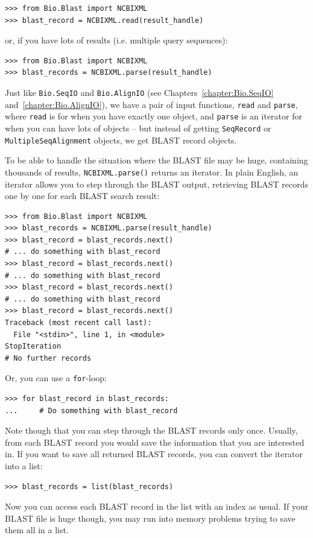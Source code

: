 \documentclass{report}
\begin{document}
\begin{verbatim}
>>> from Bio.Blast import NCBIXML
>>> blast_record = NCBIXML.read(result_handle)
\end{verbatim}

\noindent or, if you have lots of results (i.e. multiple query sequences):

\begin{verbatim}
>>> from Bio.Blast import NCBIXML
>>> blast_records = NCBIXML.parse(result_handle)
\end{verbatim}

Just like \verb|Bio.SeqIO| and \verb|Bio.AlignIO|
(see Chapters~\ref{chapter:Bio.SeqIO} and~\ref{chapter:Bio.AlignIO}),
we have a pair of input functions, \verb|read| and \verb|parse|, where
\verb|read| is for when you have exactly one object, and \verb|parse|
is an iterator for when you can have lots of objects -- but instead of
getting \verb|SeqRecord| or \verb|MultipleSeqAlignment| objects, we
get BLAST record objects.

To be able to handle the situation where the BLAST file may be huge,
containing thousands of results, \verb|NCBIXML.parse()| returns an
iterator. In plain English, an iterator allows you to step through
the BLAST output, retrieving BLAST records one by one for each BLAST
search result:

\begin{verbatim}
>>> from Bio.Blast import NCBIXML
>>> blast_records = NCBIXML.parse(result_handle)
>>> blast_record = blast_records.next()
# ... do something with blast_record
>>> blast_record = blast_records.next()
# ... do something with blast_record
>>> blast_record = blast_records.next()
# ... do something with blast_record
>>> blast_record = blast_records.next()
Traceback (most recent call last):
  File "<stdin>", line 1, in <module>
StopIteration
# No further records
\end{verbatim}

Or, you can use a \verb|for|-loop:
\begin{verbatim}
>>> for blast_record in blast_records:
...     # Do something with blast_record
\end{verbatim}

Note though that you can step through the BLAST records only once.
Usually, from each BLAST record you would save the information that
you are interested in. If you want to save all returned BLAST records,
you can convert the iterator into a list:
\begin{verbatim}
>>> blast_records = list(blast_records)
\end{verbatim}
Now you can access each BLAST record in the list with an index as usual.
If your BLAST file is huge though, you may run into memory problems trying to
save them all in a list.
\end{document}
